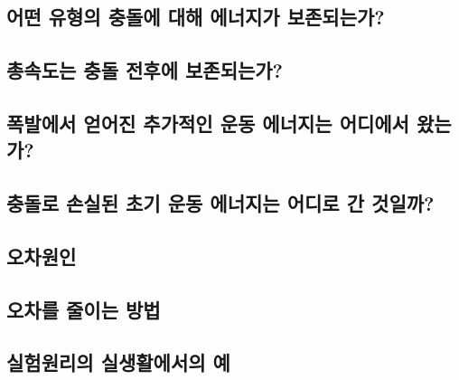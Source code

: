 \documentclass[12pt,a4paper]{article}
\begin{document}
\subsection{어떤 유형의 충돌에 대해 에너지가 보존되는가?}
\subsection{총속도는 충돌 전후에 보존되는가?}
\subsection{폭발에서 얻어진 추가적인 운동 에너지는 어디에서 왔는가?}
\subsection{충돌로 손실된 초기 운동 에너지는 어디로 간 것일까?}
\subsection{오차원인}
\subsection{오차를 줄이는 방법}
\subsection{실험원리의 실생활에서의 예}
\end{document}

